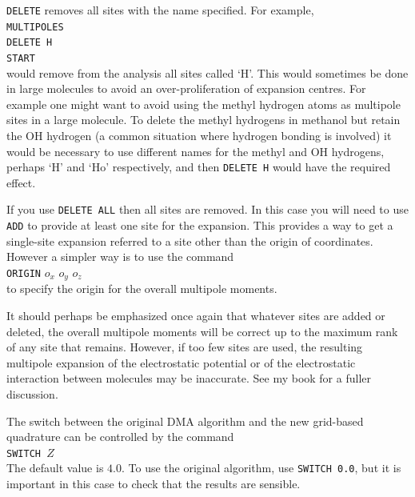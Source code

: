 \documentclass[12pt,txfonts]{paper}
\let\cite=\citep
\begin{document}
\verb/DELETE/ removes all sites with the name specified.
For example,\\
\hspace*{2 em}\verb/MULTIPOLES/\\
\hspace*{2 em}\verb/DELETE H/\\
\hspace*{2 em}\verb/START/\\
would remove from the analysis all sites called `H'. This would 
sometimes be done in large molecules to avoid an over-proliferation
of expansion centres. For example one might want to avoid
using the methyl hydrogen atoms as multipole sites in a large
molecule. To delete the methyl hydrogens in methanol but retain  
the OH hydrogen (a common situation where hydrogen bonding is
involved) it would be necessary to use different names for the methyl
and OH hydrogens, perhaps `H' and `Ho' respectively, and then
\verb/DELETE H/ would have the required effect.


If you use \verb/DELETE ALL/ then all sites are removed.
In this case you will need to use \verb/ADD/ to provide at least one
site for the expansion. This provides a way to get a single-site
expansion referred to a site other than the origin of coordinates.
However a simpler way is to use the command\\
\hspace*{2 em}\verb/ORIGIN/ $o_x$ $o_y$ $o_z$\\
to specify the origin for the overall multipole moments.

It should perhaps be emphasized once again that whatever sites are
added or deleted, the overall multipole moments will be correct up to
the maximum rank of any site that remains. However, if too few sites
are used, the resulting multipole expansion of the electrostatic
potential or of the electrostatic interaction between molecules may be
inaccurate. See my book for a fuller discussion\cite{timf}.

\label{p:switch}
The switch between the original DMA algorithm and the new grid-based
quadrature can be controlled by the command\\
\hspace*{2 em}\verb/SWITCH /$Z$\\
The default value is $4.0$. To use the original algorithm, use 
\verb/SWITCH 0.0/, but it is important in this case to check that the
results are sensible.
\end{document}
